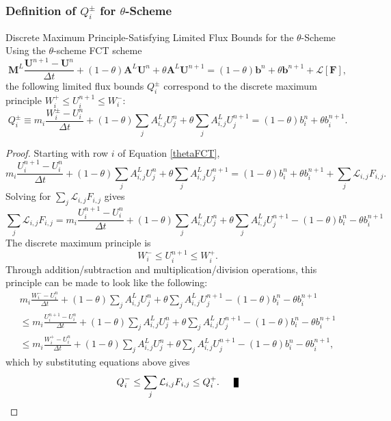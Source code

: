\subsubsection{Definition of $Q_i^\pm$ for $\theta$-Scheme}
\begin{theorem}{Discrete Maximum Principle-Satisfying Limited Flux Bounds for
  the $\theta$-Scheme}
  Using the $\theta$-scheme FCT scheme
  \begin{equation}\label{thetaFCT}
    \mathbf{M}^L\frac{\mathbf{U}^{n+1}-\mathbf{U}^n}{\Delta t}
    + (1-\theta)\mathbf{A}^L\mathbf{U}^n + \theta\mathbf{A}^L\mathbf{U}^{n+1}
    = (1-\theta)\mathbf{b}^n + \theta\mathbf{b}^{n+1}
    + \mathcal{L}[\mathbf{F}],
  \end{equation}
  the following limited flux bounds $Q_i^\pm$ correspond to the discrete
   maximum principle $W_i^+\le U_i^{n+1}\le W_i^-$:
   \begin{equation}
      Q_i^\pm \equiv m_i\frac{W_i^\pm - U_i^n}{\Delta t}
      +(1-\theta)\sum\limits_j A_{i,j}^L U_j^n
      +\theta\sum\limits_j A_{i,j}^L U_j^{n+1}
      =(1-\theta)b_i^n
      +\theta b_i^{n+1}.
   \end{equation}
\end{theorem}

\begin{proof}
  Starting with row $i$ of Equation \eqref{thetaFCT},
   \[
      m_i\frac{U_i^{n+1}-U_i^n}{\Delta t}
      + (1-\theta)\sum\limits_j A_{i,j}^L U_j^n
      + \theta\sum\limits_j A_{i,j}^L U_j^{n+1}
      = (1-\theta)b_i^n
      + \theta b_i^{n+1}
      + \sum\limits_j\mathcal{L}_{i,j}F_{i,j}.
   \]
   Solving for $\sum\limits_j\mathcal{L}_{i,j}F_{i,j}$ gives
   \[
      \sum\limits_j\mathcal{L}_{i,j}F_{i,j} =
      m_i\frac{U_i^{n+1}-U_i^n}{\Delta t}
      + (1-\theta)\sum\limits_j A_{i,j}^L U_j^n
      + \theta\sum\limits_j A_{i,j}^L U_j^{n+1}
      - (1-\theta)b_i^n
      - \theta b_i^{n+1}
   \]
   The discrete maximum principle is
   \[
      W_i^-\le U_i^{n+1}\le W_i^+.
   \]
   Through addition/subtraction and multiplication/division operations, this
   principle can be made to look like the following:
   \begin{multline*}
   m_i\frac{W_i^--U_i^n}{\Delta t}
      + (1-\theta)\sum\limits_j A_{i,j}^L U_j^n
      + \theta\sum\limits_j A_{i,j}^L U_j^{n+1}
      - (1-\theta)b_i^n
      - \theta b_i^{n+1}\\
   \le m_i\frac{U_i^{n+1}-U_i^n}{\Delta t}
      + (1-\theta)\sum\limits_j A_{i,j}^L U_j^n
      + \theta\sum\limits_j A_{i,j}^L U_j^{n+1}
      - (1-\theta)b_i^n
      - \theta b_i^{n+1}\\
   \le m_i\frac{W_i^+-U_i^n}{\Delta t}
      + (1-\theta)\sum\limits_j A_{i,j}^L U_j^n
      + \theta\sum\limits_j A_{i,j}^L U_j^{n+1}
      - (1-\theta)b_i^n
      - \theta b_i^{n+1},
   \end{multline*}
   which by substituting equations above gives
   \[
      Q_i^-\le\sum\limits_j \mathcal{L}_{i,j}F_{i,j}\le Q_i^+.\qed
   \]
\end{proof}